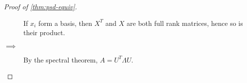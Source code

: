 \begin{proof}[Proof of \cref{thm:psd-equiv}]
\begin{description}
            If $x_i$ form a basis, then $X^T$ and $X$ are both full rank
            matrices, hence so is their product.
        \item[\labelcref{thm:psd-equiv:2} $\implies$ \labelcref{thm:psd-equiv:4}]
            By the spectral theorem, $A = U^T \Lambda U$.

\end{description}
\end{proof}
